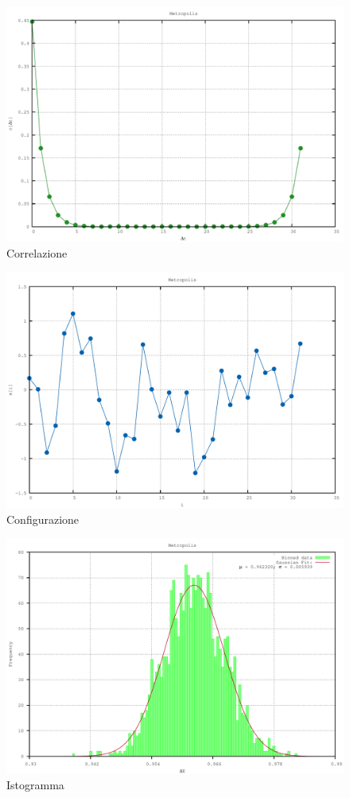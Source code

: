 \documentclass[a4paper,11pt]{report}
\begin{document}
\begin{figure}[h]
\centering
\includegraphics[width=\textwidth]{correlation}
\caption{Correlazione}
\label{fig:correlation}
\end{figure}

\begin{figure}[h]
\centering
\includegraphics[width=\textwidth]{configuration}
\caption{Configurazione}
\label{fig:configuration}
\end{figure}

\begin{figure}[h]
\centering
\includegraphics[width=\textwidth]{histogram}
\caption{Istogramma}
\label{fig:histogram}
\end{figure}
\end{document}
